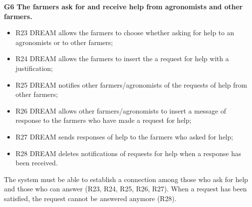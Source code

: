 \documentclass{article}
\begin{document}
\vspace{5mm}
\textbf{G6 The farmers ask for and receive help from agronomists and other farmers.}
\begin{itemize}
    \item R23 DREAM allows the farmers to choose whether asking for help to an agronomists or to other farmers;

    \item R24 DREAM allows the farmers to insert the a request for help with a justification;

    \item R25 DREAM notifies other farmers/agronomists of the requests of help from other farmers;

    \item R26 DREAM allows other farmers/agronomists to insert a message of response to the farmers who have made a request for help;

    \item R27 DREAM sends responses of help to the farmers who asked for help;

    \item R28 DREAM deletes notifications of requests for help when a response has been received.
\end{itemize}
The system must be able to establish a connection among those who ask for help and those who can answer (R23, R24, R25, R26, R27). When a request has been satisfied, the request cannot be answered anymore (R28).
\end{document}
